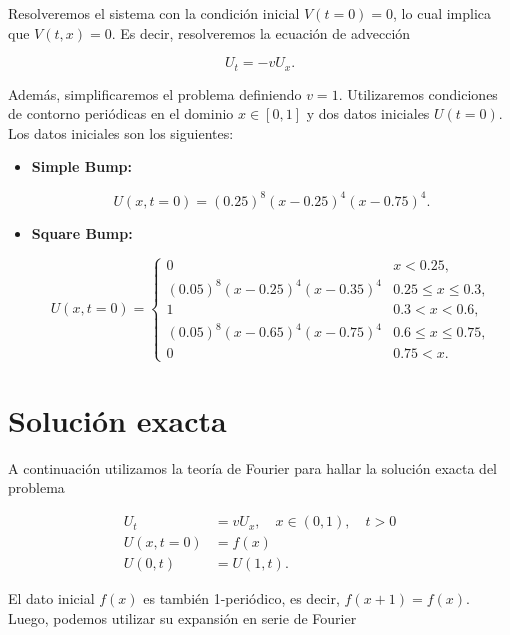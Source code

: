 \documentclass[12pt]{article}
\begin{document}
Resolveremos el sistema con la condici\'on inicial $V(t=0) = 0$, lo cual implica que $V(t, x) = 0$. Es decir, resolveremos la ecuaci\'on de advecci\'on

\begin{equation}\label{eq:adv}
U_t = - v U_x.
\end{equation}

Adem\'as, simplificaremos el problema definiendo $v = 1$. Utilizaremos condiciones de contorno peri\'odicas en el dominio $x\in [0,1]$ y dos datos iniciales $U(t=0)$. Los datos iniciales son los siguientes:

\begin{itemize}
\item \textbf{Simple Bump:} 

\begin{equation}
U(x, t=0) = (0.25)^{8}(x - 0.25)^4 (x - 0.75)^4.
\end{equation}

\item \textbf{Square Bump:} 

\begin{equation}
U(x, t=0) = 
\begin{cases}
0 & x < 0.25,\\
(0.05)^8(x-0.25)^4 (x-0.35)^4 & 0.25 \leq x \leq 0.3, \\
1 & 0.3 < x < 0.6, \\
(0.05)^8(x-0.65)^4 (x-0.75)^4 & 0.6 \leq x \leq 0.75, \\
0 & 0.75 < x.
\end{cases}
\end{equation}

\end{itemize}

\section{Soluci\'on exacta}

A continuaci\'on utilizamos la teor\'ia de Fourier para hallar la soluci\'on exacta del problema

\begin{align} \label{eq:system}
U_t &= v U_x,\quad x\in (0, 1), \quad t > 0 \nonumber \\
U(x, t=0) &= f(x)\\
U(0, t) &= U(1, t). \nonumber
\end{align}

El dato inicial $f(x)$ es tambi\'en 1-peri\'odico, es decir, $f(x+1) = f(x)$. Luego, podemos utilizar su expansi\'on en serie de Fourier
\end{document}
